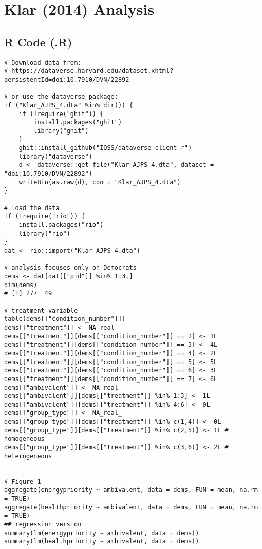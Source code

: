 \documentclass[a4paper]{exam}
\begin{document}
\clearpage

\section{Klar (2014) Analysis}

\subsection*{R Code (.R)}

\begin{verbatim}
# Download data from: 
# https://dataverse.harvard.edu/dataset.xhtml?persistentId=doi:10.7910/DVN/22892

# or use the dataverse package:
if ("Klar_AJPS_4.dta" %in% dir()) {
    if (!require("ghit")) {
        install.packages("ghit")
        library("ghit")
    }
    ghit::install_github("IQSS/dataverse-client-r")
    library("dataverse")
    d <- dataverse::get_file("Klar_AJPS_4.dta", dataset = "doi:10.7910/DVN/22892")
    writeBin(as.raw(d), con = "Klar_AJPS_4.dta")
}

# load the data
if (!require("rio")) {
    install.packages("rio")
    library("rio")
}
dat <- rio::import("Klar_AJPS_4.dta")

# analysis focuses only on Democrats
dems <- dat[dat[["pid"]] %in% 1:3,]
dim(dems)
# [1] 277  49

# treatment variable
table(dems[["condition_number"]])
dems[["treatment"]] <- NA_real_
dems[["treatment"]][dems[["condition_number"]] == 2] <- 1L
dems[["treatment"]][dems[["condition_number"]] == 3] <- 4L
dems[["treatment"]][dems[["condition_number"]] == 4] <- 2L
dems[["treatment"]][dems[["condition_number"]] == 5] <- 5L
dems[["treatment"]][dems[["condition_number"]] == 6] <- 3L
dems[["treatment"]][dems[["condition_number"]] == 7] <- 6L
dems[["ambivalent"]] <- NA_real_
dems[["ambivalent"]][dems[["treatment"]] %in% 1:3] <- 1L
dems[["ambivalent"]][dems[["treatment"]] %in% 4:6] <- 0L
dems[["group_type"]] <- NA_real_
dems[["group_type"]][dems[["treatment"]] %in% c(1,4)] <- 0L
dems[["group_type"]][dems[["treatment"]] %in% c(2,5)] <- 1L # homogeneous
dems[["group_type"]][dems[["treatment"]] %in% c(3,6)] <- 2L # heterogeneous


# Figure 1
aggregate(energypriority ~ ambivalent, data = dems, FUN = mean, na.rm = TRUE)
aggregate(healthpriority ~ ambivalent, data = dems, FUN = mean, na.rm = TRUE)
## regression version
summary(lm(energypriority ~ ambivalent, data = dems))
summary(lm(healthpriority ~ ambivalent, data = dems))


\end{verbatim}
\end{document}
